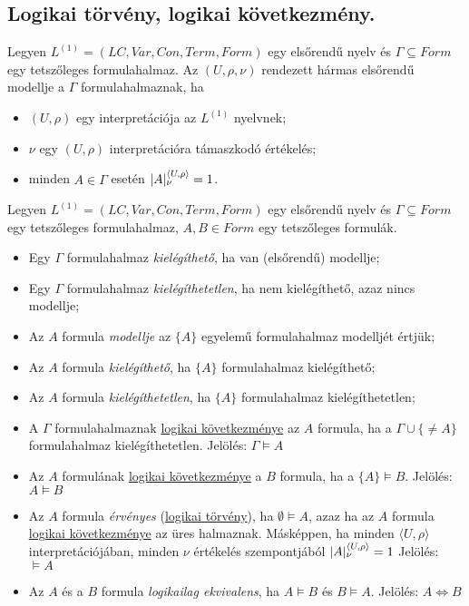\subsection{Logikai törvény, logikai következmény.}
\begin{definition}[modell]
	Legyen $L^{(1)} = (LC, Var, Con, Term, Form)$ egy elsőrendű nyelv és $\Gamma \subseteq Form$ egy tetszőleges formulahalmaz. Az $(U, \rho, \nu)$ rendezett hármas elsőrendű modellje a $\Gamma$ formulahalmaznak, ha 
	\begin{itemize}
		\item  $(U, \rho)$ egy interpretációja az $L^{(1)}$ nyelvnek; 
		\item  $\nu$ egy $(U, \rho)$ interpretációra támaszkodó értékelés; 
		\item  minden  $A \in \Gamma$ esetén $|A|^{\langle U, \rho \rangle}_{\nu} = 1$.
	\end{itemize}
	
\end{definition}
\begin{definition}
	Legyen $L^{(1)} = (LC, Var, Con, Term, Form)$ egy elsőrendű nyelv és $\Gamma \subseteq Form$ egy tetszőleges formulahalmaz, $A,B \in Form$ egy tetszőleges formulák.
	\begin{itemize}
		\item Egy $\Gamma$ formulahalmaz \emph{kielégíthető}, ha van (elsőrendű) modellje;
		\item Egy $\Gamma$ formulahalmaz \emph{kielégíthetetlen}, ha nem kielégíthető, azaz nincs modellje;
		\item Az $A$ formula \emph{modellje} az $\{A\}$ egyelemű formulahalmaz modelljét értjük;
		\item Az $A$ formula \emph{kielégíthető}, ha $\{A\}$ formulahalmaz kielégíthető;
		\item Az $A$ formula \emph{kielégíthetetlen}, ha $\{A\}$ formulahalmaz kielégíthetetlen;
		\item A  $\Gamma$ formulahalmaznak \underline{logikai következménye} az $A$ formula, ha a $\Gamma \cup \{\neq A\}$ formulahalmaz kielégíthetetlen. Jelölés: $\Gamma \models A$ 
		\item Az $A$ formulának \underline{logikai következménye} a $B$ formula, ha a $\{A\} \models B$. Jelölés: $A \models B$ 
		\item Az $A$ formula \emph{érvényes} (\underline{logikai törvény})\label{def:logikai törvény}, ha $\emptyset \models A$, azaz ha az $A$ formula \underline{logikai következménye} az üres halmaznak. Másképpen, ha minden $ \langle U, \rho \rangle$ interpretációjában, minden $\nu$ értékelés szempontjából $|A|^{\langle U, \rho \rangle}_{\nu} = 1$ Jelölés: $\models A$
		\item Az $A$ és a $B$ formula \emph{logikailag ekvivalens}, ha $A \models B$ és $B \models A$. Jelölés: $A \Leftrightarrow B$ 
	\end{itemize}
\end{definition}


